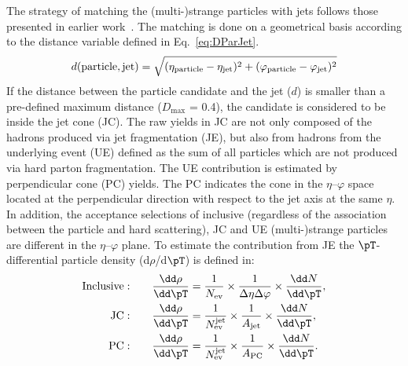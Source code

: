 \documentclass[ALICE,manyauthors]{cernphprep}
\begin{document}
The strategy of matching the (multi-)strange particles with jets follows those presented in earlier work~\cite{Acharya:2021oaa}.
The matching is done on a geometrical basis according to the distance variable defined in Eq.~\ref{eq:DParJet}.
\begin{equation}
d(\mathrm{particle, jet}) = \sqrt{(\eta_\mathrm{particle} -\eta_{\rm jet})^{2} + (\varphi_\mathrm{particle} -\varphi_{\rm jet})^{2}}
\label{eq:DParJet}
\end{equation}
If the distance between the particle candidate and the jet ($d$) is smaller than a pre-defined maximum distance ($D_\mathrm{max}$ = 0.4), the candidate is considered to be inside the jet cone (JC).
The raw yields in JC are not only composed of the hadrons produced via jet fragmentation (JE), but also from hadrons from the underlying event (UE) defined as the sum of all particles which are not produced via hard parton fragmentation.
The UE contribution is estimated by perpendicular cone (PC) yields.
The PC indicates the cone in the $\eta$--$\varphi$ space located at the perpendicular direction with respect to the jet axis at the same $\eta$.
In addition, the acceptance selections of inclusive (regardless of the association between the particle and hard scattering), JC and UE (multi-)strange particles are different in the $\eta$--$\varphi$ plane.
To estimate the contribution from JE the $\pT$-differential particle density (d$\rho$/d$\pT$) is defined in:
\begin{equation}
\begin{split}
{\rm Inclusive:}\qquad & \frac{\dd\rho}{\dd\pT} = \frac{1}{N_{\rm ev}}\times\frac{1}{\Delta\eta\Delta\varphi}\times\frac{\dd N}{\dd\pT}, \\
{\rm JC:}\qquad & \frac{\dd\rho}{\dd\pT} = \frac{1}{N_{\rm ev}^{\rm jet}} \times\frac{1}{A_{\rm jet}}\times\frac{\dd N}{\dd\pT}, \\
{\rm PC:}\qquad & \frac{\dd\rho}{\dd\pT} = \frac{1}{N_{\rm ev}^{\rm jet}} \times\frac{1}{A_{\rm PC}}\times\frac{\dd N}{\dd\pT}. \\
\end{split}
\label{eq:normalize}
\end{equation}
\end{document}
